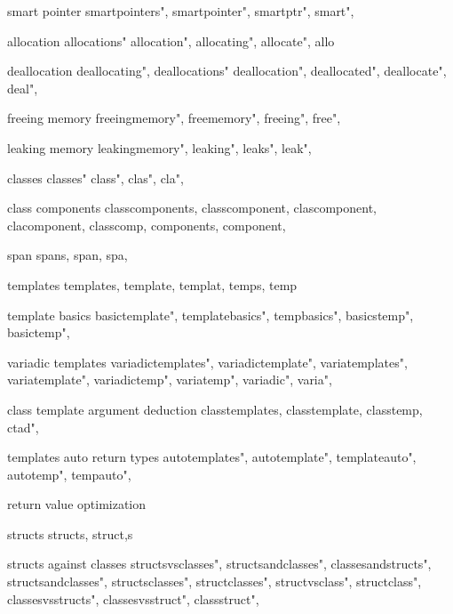          smart pointer
        smartpointers",
        smartpointer", 
        smartptr", 
        smart",
        
         allocation 
        allocations"
        allocation",
        allocating",
        allocate",
        allo
        
         deallocation 
        deallocating",
        deallocations"
        deallocation",
        deallocated", 
        deallocate",
        deal",
        
         freeing memory 
        freeingmemory",  
        freememory",  
        freeing", 
        free", 
        
         leaking memory 
        leakingmemory", 
        leaking", 
        leaks", 
        leak", 
        
         classes 
        classes"
        class",
        clas",
        cla",
        
         class components 
        classcomponents,  
        classcomponent,  
        clascomponent,  
        clacomponent,  
        classcomp,  
        components,  
        component,  
        
         span 
        spans,  
        span,  
        spa,  
        
         templates
        templates,
        template,
        templat,
        temps,
        temp
        
         template basics 
        basictemplate",  
        templatebasics",  
        tempbasics",  
        basicstemp",  
        basictemp",  
        
         variadic templates
        variadictemplates",  
        variadictemplate",  
        variatemplates",  
        variatemplate",  
        variadictemp",  
        variatemp",  
        variadic",  
        varia",  
        
         class template argument deduction 
        classtemplates,  
        classtemplate,  
        classtemp,  
        ctad", 
        
         templates auto return types 
        autotemplates",  
        autotemplate",  
        templateauto",  
        autotemp",  
        tempauto",  
        
         return value optimization 
        
         structs 
        structs,
        struct,s
        
         structs against classes 
        structsvsclasses",  
        structsandclasses",  
        classesandstructs",  
        structsandclasses",  
        structsclasses",  
        structclasses",  
        structvsclass",  
        structclass",  
        classesvsstructs",  
        classesvsstruct",  
        classstruct",  
        
